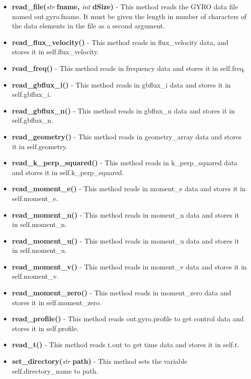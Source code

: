 \documentclass{article}
\begin{document}
\begin{itemize}
\begin{enumerate}
\end{enumerate}
\item \textbf{read\_file(}\emph{str}\textbf{ fname,}\emph{ int}\textbf{ dSize)} - This method reads the GYRO data file named out.gyro.fname.  It must be given the length in number of characters of the data elements in the file as a second argument.
\item \textbf{read\_flux\_velocity()} - This method reads in flux\_velocity data, and stores it in self.flux\_velocity.
\item \textbf{read\_freq()} - This method reads in frequency data and stores it in self.freq.
\item \textbf{read\_gbflux\_i()} - This method reads in gbflux\_i data and stores it in self.gbflux\_i.
\item \textbf{read\_gbflux\_n()} - This method reads in gbflux\_n data and stores it in self.gbflux\_n.
\item \textbf{read\_geometry()} - This method reads in geometry\_array data and stores it in self.geometry.
\item \textbf{read\_k\_perp\_squared()} - This method reads in k\_perp\_squared data and stores it in self.k\_perp\_squared.
\item \textbf{read\_moment\_e()} - This method reads in moment\_e data and stores it in self.moment\_e.
\item \textbf{read\_moment\_n()} - This method reads in moment\_n data and stores it in self.moment\_n.
\item \textbf{read\_moment\_u()} - This method reads in moment\_u data and stores it in self.moment\_u.
\item \textbf{read\_moment\_v()} - This method reads in moment\_v data and stores it in self.moment\_v.
\item \textbf{read\_moment\_zero()} - This method reads in moment\_zero data and stores it in self.moment\_zero.
\item \textbf{read\_profile()} - This method reads out.gyro.profile to get control data and stores it in self.profile.
\item \textbf{read\_t()} - This method reads t.out to get time data and stores it in self.t.
\item \textbf{set\_directory(}\emph{str}\textbf{ path)} - This method sets the variable self.directory\_name to path.
\end{itemize}
\end{document}

